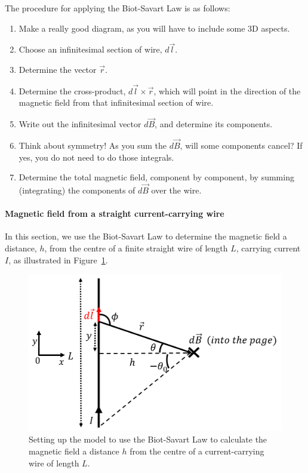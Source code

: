 The procedure for applying the Biot-Savart Law is as follows:

\begin{enumerate}
\item Make a really good diagram, as you will have to include some 3D aspects.
\item Choose an infinitesimal section of wire, $d\vec l$.
\item Determine the vector $\vec r$.
\item Determine the cross-product, $d\vec l \times \vec r$, which will point in the direction of the magnetic field from that infinitesimal section of wire.
\item Write out the infinitesimal vector $d\vec B$, and determine its components.
\item Think about symmetry! As you sum the $d\vec B$, will some components cancel? If yes, you do not need to do those integrals.
\item Determine the total magnetic field, component by component, by summing (integrating) the components of $d\vec B$ over the wire.
\end{enumerate}

\paragraph{Magnetic field from a straight current-carrying wire}

In this section, we use the Biot-Savart Law to determine the magnetic field a distance, $h$, from the centre of a finite straight wire of length $L$, carrying current $I$, as illustrated in Figure~\ref{fig:magneticsource:bswire}.

\begin{figure}[!htbp]
\centering
\includegraphics[width=0.7\linewidth]{files/bswire-dc40e864732d43d30aeb03f08e4a9a7e.png}
\caption[]{Setting up the model to use the Biot-Savart Law to calculate the magnetic field a distance $h$ from the centre of a current-carrying wire of length $L$.}
\label{fig:magneticsource:bswire}
\end{figure}


